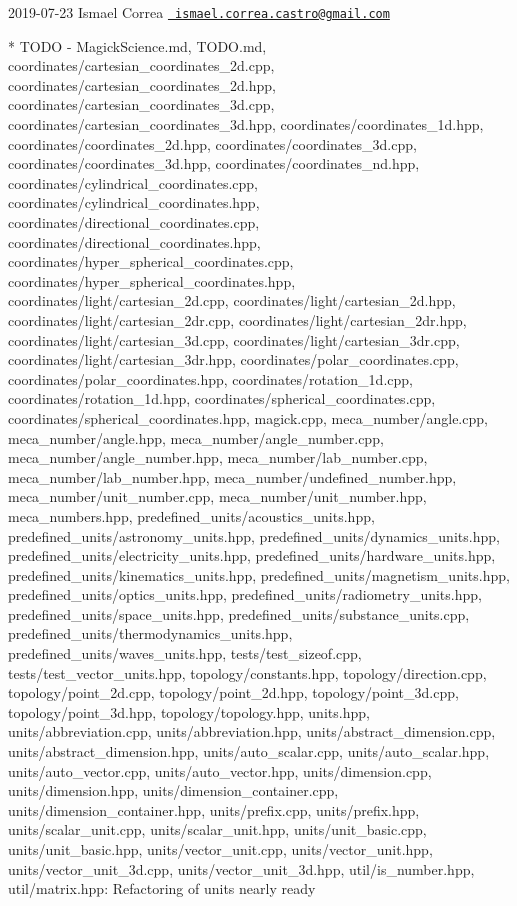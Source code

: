  2019-\/07-\/23 Ismael Correa \href{mailto:ismael.correa.castro@gmail.com}{\texttt{ ismael.\+correa.\+castro@gmail.\+com}} \begin{DoxyVerb}* TODO - MagickScience.md, TODO.md,
coordinates/cartesian_coordinates_2d.cpp,
coordinates/cartesian_coordinates_2d.hpp,
coordinates/cartesian_coordinates_3d.cpp,
coordinates/cartesian_coordinates_3d.hpp,
coordinates/coordinates_1d.hpp, coordinates/coordinates_2d.hpp,
coordinates/coordinates_3d.cpp, coordinates/coordinates_3d.hpp,
coordinates/coordinates_nd.hpp,
coordinates/cylindrical_coordinates.cpp,
coordinates/cylindrical_coordinates.hpp,
coordinates/directional_coordinates.cpp,
coordinates/directional_coordinates.hpp,
coordinates/hyper_spherical_coordinates.cpp,
coordinates/hyper_spherical_coordinates.hpp,
coordinates/light/cartesian_2d.cpp,
coordinates/light/cartesian_2d.hpp,
coordinates/light/cartesian_2dr.cpp,
coordinates/light/cartesian_2dr.hpp,
coordinates/light/cartesian_3d.cpp,
coordinates/light/cartesian_3dr.cpp,
coordinates/light/cartesian_3dr.hpp,
coordinates/polar_coordinates.cpp,
coordinates/polar_coordinates.hpp, coordinates/rotation_1d.cpp,
coordinates/rotation_1d.hpp, coordinates/spherical_coordinates.cpp,
coordinates/spherical_coordinates.hpp, magick.cpp,
meca_number/angle.cpp, meca_number/angle.hpp,
meca_number/angle_number.cpp, meca_number/angle_number.hpp,
meca_number/lab_number.cpp, meca_number/lab_number.hpp,
meca_number/undefined_number.hpp, meca_number/unit_number.cpp,
meca_number/unit_number.hpp, meca_numbers.hpp,
predefined_units/acoustics_units.hpp,
predefined_units/astronomy_units.hpp,
predefined_units/dynamics_units.hpp,
predefined_units/electricity_units.hpp,
predefined_units/hardware_units.hpp,
predefined_units/kinematics_units.hpp,
predefined_units/magnetism_units.hpp,
predefined_units/optics_units.hpp,
predefined_units/radiometry_units.hpp,
predefined_units/space_units.hpp,
predefined_units/substance_units.cpp,
predefined_units/thermodynamics_units.hpp,
predefined_units/waves_units.hpp, tests/test_sizeof.cpp,
tests/test_vector_units.hpp, topology/constants.hpp,
topology/direction.cpp, topology/point_2d.cpp,
topology/point_2d.hpp, topology/point_3d.cpp,
topology/point_3d.hpp, topology/topology.hpp, units.hpp,
units/abbreviation.cpp, units/abbreviation.hpp,
units/abstract_dimension.cpp, units/abstract_dimension.hpp,
units/auto_scalar.cpp, units/auto_scalar.hpp,
units/auto_vector.cpp, units/auto_vector.hpp, units/dimension.cpp,
units/dimension.hpp, units/dimension_container.cpp,
units/dimension_container.hpp, units/prefix.cpp, units/prefix.hpp,
units/scalar_unit.cpp, units/scalar_unit.hpp, units/unit_basic.cpp,
units/unit_basic.hpp, units/vector_unit.cpp, units/vector_unit.hpp,
units/vector_unit_3d.cpp, units/vector_unit_3d.hpp,
util/is_number.hpp, util/matrix.hpp: Refactoring of units nearly
ready
\end{DoxyVerb}
